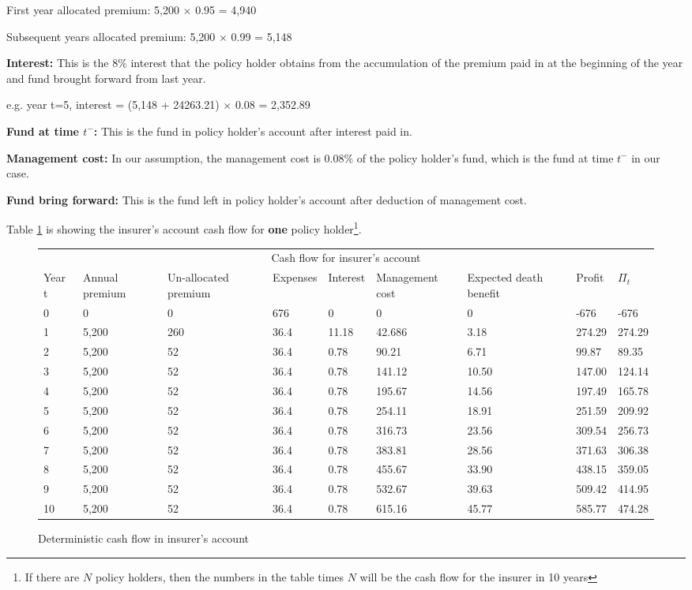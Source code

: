 \documentclass{report}
\begin{document}
First year allocated premium:                5,200 $\times$ 0.95 = 4,940

Subsequent years allocated premium:   5,200 $\times$ 0.99 = 5,148


\textbf{Interest:} This is the 8\% interest that the policy holder obtains from the accumulation of the premium paid in at the beginning of the year and fund brought forward from last year.

e.g.  year t=5, interest = (5,148 + 24263.21) $\times$ 0.08 = 2,352.89

\textbf{Fund at time $t^-$:} This is the fund in policy holder's account after interest paid in.

\textbf{Management cost:} In our assumption, the management cost is 0.08\% of the policy holder's fund, which is the fund at time $t^-$ in our case. 

\textbf{Fund bring forward:} This is the fund left in policy holder's account after deduction of management cost. 


Table \ref{determ-insurer} is showing the insurer's account cash flow for \textbf{one} policy holder\footnote{If there are $N$ policy holders, then the numbers in the table times $N$ will be the cash flow for the insurer in 10 years}. 


\begin{figure}[H]
\hfill
    \centering
\begin{tabular}{p{0.8cm} p{1.5cm} p{1.5cm} p{1.2cm} p{1cm} p{2cm}p{1.5cm} p{1.5cm} p{1.5cm} }
\toprule
\multicolumn{9}{c}{Cash flow for insurer's account} \\
\cmidrule(r){3-7}

Year t & Annual premium & Un-allocated premium & Expenses & Interest &Management cost& Expected death benefit & Profit& $\Pi_t$  \\
\midrule

0&0&0&676&0&0&0&-676&-676\\
1&5,200&260&36.4&11.18&42.686&3.18&274.29&274.29\\
2&5,200&52&36.4&0.78&90.21&6.71&99.87&89.35\\
3&5,200&52&36.4&0.78&141.12&10.50&147.00&124.14\\
4&5,200&52&36.4&0.78&195.67&14.56&197.49&165.78\\
5&5,200&52&36.4&0.78&254.11&18.91&251.59&209.92\\
6&5,200&52&36.4&0.78&316.73&23.56&309.54&256.73\\
7&5,200&52&36.4&0.78&383.81&28.56&371.63&306.38\\
8&5,200&52&36.4&0.78&455.67&33.90&438.15&359.05\\
9&5,200&52&36.4&0.78&532.67&39.63&509.42&414.95\\
10&5,200&52&36.4&0.78&615.16&45.77&585.77&474.28\\

\bottomrule
\end{tabular}
\caption{Deterministic cash flow in insurer's account}
\label{determ-insurer}
\end{figure}
\end{document}
